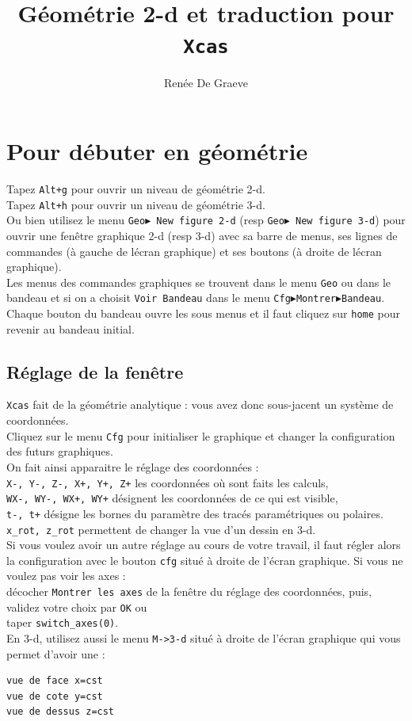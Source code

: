\documentclass[a4paper,11pt]{book}
\title{G\'eom\'etrie 2-d et traduction pour\\ {\tt Xcas}}
\author{Ren\'ee De Graeve}
\begin{document}
\maketitle
\chapter{Pour d\'ebuter en g\'eom\'etrie}
Tapez {\tt Alt+g}  pour ouvrir un niveau de g\'eom\'etrie 2-d.\\ 
Tapez {\tt Alt+h}  pour ouvrir un niveau de g\'eom\'etrie 3-d.\\
Ou bien utilisez le menu
{\tt Geo$\blacktriangleright$ New figure 2-d} (resp 
{\tt Geo$\blacktriangleright$ New figure 3-d}) pour 
ouvrir une fen\^etre graphique 2-d (resp 3-d) avec sa barre de menus, ses 
lignes de commandes (\`a gauche de l\'ecran graphique) et ses boutons 
(\`a droite de l\'ecran graphique).\\
Les menus des commandes graphiques se trouvent dans le menu {\tt Geo} ou dans 
le bandeau et si on a choisit {\tt Voir Bandeau} dans le menu 
{\tt Cfg$\blacktriangleright$Montrer$\blacktriangleright$Bandeau}.
Chaque bouton du bandeau ouvre les sous menus et il faut cliquez sur {\tt home}
pour revenir au bandeau initial. 
\section{R\'eglage de la fen\^etre}
{\tt Xcas} fait de la g\'eom\'etrie analytique : vous avez donc sous-jacent un
syst\`eme de coordonn\'ees.\\
Cliquez sur le menu {\tt Cfg} pour initialiser le graphique et changer 
la configuration des futurs graphiques.\\
On fait ainsi apparaitre le r\'eglage des  coordonn\'ees :\\
{\tt X-, Y-, Z-, X+, Y+, Z+}  les coordonn\'ees o\`u sont faits les calculs,\\ 
{\tt WX-, WY-, WX+, WY+} d\'esignent les coordonn\'ees de ce qui est visible,\\
{\tt t-, t+} d\'esigne les bornes du  param\`etre des trac\'es param\'etriques 
ou polaires.\\
{\tt x\_rot, z\_rot} permettent de changer la vue d'un dessin en 3-d.\\
Si vous voulez avoir un autre r\'eglage au cours de votre travail, il faut 
r\'egler alors la configuration avec le bouton {\tt cfg} situ\'e \`a droite de 
l'\'ecran graphique. Si vous ne voulez pas voir les axes :\\
d\'ecocher {\tt Montrer les axes} de la fen\^etre du  r\'eglage des  
coordonn\'ees, puis, validez votre choix par {\tt OK} ou \\
taper {\tt  switch\_axes(0)}.\\
En 3-d, utilisez aussi le menu {\tt M->3-d} situ\'e \`a droite de 
l'\'ecran graphique qui vous permet d'avoir une :
\begin{verbatim}
vue de face x=cst
vue de cote y=cst
vue de dessus z=cst
\end{verbatim}
\end{document}
